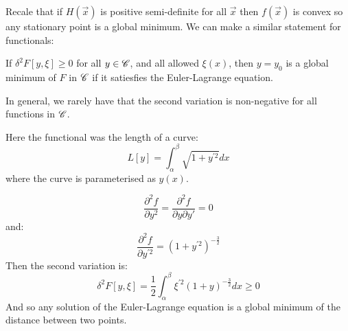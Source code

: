 \documentclass[../Main.tex]{subfiles}
\begin{document}
Recale that if $H(\vec{x})$ is positive semi-definite for all $\vec{x}$ then $f(\vec{x})$ is convex so any stationary point is a global minimum. We can make a similar statement for functionals:
\begin{theorem}
    If $\delta^2 F[y, \xi] \geq 0$ for all $y \in \mathscr{C}$, and all allowed $\xi(x)$, then $y = y_0$ is a global minimum of $F$ in $\mathscr{C}$ if it satiesfies the Euler-Lagrange equation.
\end{theorem}
\begin{remark}
    In general, we rarely have that the second variation is non-negative for all functions in $\mathscr{C}$.
\end{remark}
\begin{example}
    Here the functional was the length of a curve:
    \begin{equation*}
        L[y] = \int_\alpha^\beta \sqrt{1 + y^{\prime 2}} dx
    \end{equation*}
    where the curve is parameterised as $y(x)$.
    
    \begin{equation*}
        \frac{\partial^{2}f}{\partial y^{2}} = \frac{\partial^{2}f}{\partial y\partial y'} = 0
    \end{equation*}
    and:
    \begin{equation*}
        \frac{\partial^{2}f}{\partial y^{\prime 2}} = (1 + y^{\prime 2}) ^{-\frac32}
    \end{equation*}
    Then the second variation is:
    \begin{equation*}
        \delta^2 F[y, \xi] = \frac12 \int_\alpha^\beta \xi^{\prime 2} (1 + y)^{-\frac32} dx \geq 0
    \end{equation*}
    And so any solution of the Euler-Lagrange equation is a global minimum of the distance between two points.
\end{example}
\end{document}

